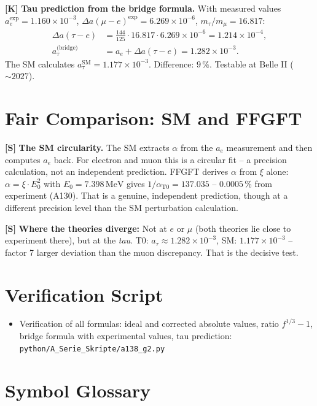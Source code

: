 \textbf{[K]} \textbf{Tau prediction from the bridge formula.} With measured values
$a_e^\text{exp}=1{.}160\times10^{-3}$,
$\Delta a(\mu-e)^\text{exp}=6{.}269\times10^{-6}$,
$m_\tau/m_\mu=16{.}817$:
\begin{align*}
  \Delta a(\tau-e) &= \frac{144}{125}\cdot16{.}817\cdot6{.}269\times10^{-6}
  = 1{.}214\times10^{-4},\\
  a_\tau^\text{(bridge)} &= a_e + \Delta a(\tau-e)
  = \boxed{1{.}282\times10^{-3}}.
\end{align*}
The SM calculates $a_\tau^\text{SM}=1{.}177\times10^{-3}$. Difference: $9\,\%$.
Testable at Belle II ($\sim2027$).

\section{Fair Comparison: SM and FFGFT}

\textbf{[S]} \textbf{The SM circularity.} The SM extracts $\alpha$ from the
$a_e$ measurement and then computes $a_e$ back. For electron and muon this is a
circular fit -- a precision calculation, not an independent prediction. FFGFT
derives $\alpha$ from $\xi$ alone: $\alpha=\xi\cdot E_0^2$ with
$E_0=7{.}398\,\text{MeV}$ gives $1/\alpha_\text{T0}=137{.}035$ -- $0{.}0005\,\%$
from experiment (A130). That is a genuine, independent prediction, though at a
different precision level than the SM perturbation calculation.

\textbf{[S]} \textbf{Where the theories diverge:} Not at $e$ or $\mu$ (both
theories lie close to experiment there), but at the \emph{tau}. T0:
$a_\tau\approx1{.}282\times10^{-3}$, SM: $1{.}177\times10^{-3}$ -- factor 7
larger deviation than the muon discrepancy. That is the decisive test.

\section{Verification Script}

\begin{itemize}[leftmargin=2em,itemsep=2pt,topsep=2pt]
  \item Verification of all formulas: ideal and corrected absolute values, ratio
    $f^{1/3}-1$, bridge formula with experimental values, tau prediction:
    \texttt{python/A\_Serie\_Skripte/a138\_g2.py}
\end{itemize}

\section{Symbol Glossary}

